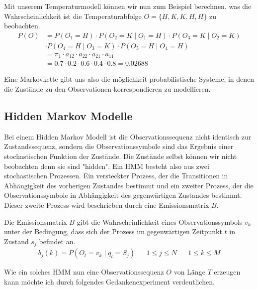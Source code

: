 Mit unserem Temperaturmodell können wir nun zum Beispiel berechnen, was die Wahrscheinlichkeit ist die Temperaturabfolge $O = \{H, K, K, H, H\}$ zu beobachten.
\begin{align*}
    P(O) & = P(O_1 = H) \cdot P(O_2 = K \mid O_1 = H) \cdot P(O_3 = K \mid O_2 = K) \\
    & \cdot P(O_4=H \mid O_3 = K) \cdot P(O_5 = H \mid O_4 = H) \\
    & = \pi_1 \cdot a_{12} \cdot a_{22} \cdot a_{21} \cdot a_{11} \\
    & = 0.7 \cdot 0.2 \cdot 0.6 \cdot 0.4 \cdot 0.8 = 0.02688
\end{align*}

Eine Markovkette gibt uns also die möglichkeit probabilistische Systeme, in denen die Zustände zu den Observationen korrespondieren zu modellieren.

\subsection{Hidden Markov Modelle}
Bei einem Hidden Markov Modell ist die Observationssequenz nicht identisch zur Zustandssequenz, sondern die Observationssymbole sind das Ergebnis einer stochastischen Funktion der Zustände. Die Zustände selbst können wir nicht beobachten denn sie sind "hidden". Ein HMM besteht also aus zwei stochastischen Prozessen. Ein versteckter Prozess, der die Transitionen in Abhängigkeit des vorherigen Zustandes bestimmt und ein zweiter Prozess, der die Observationssymbole in Abhängigkeit des gegenwärtigen Zustandes bestimmt.
Dieser zweite Prozess wird beschrieben durch eine Emissionsmatrix $B$.
\begin{definition}[Emissionsmatrix $B=\{b_j(k)\}$]

    Die Emissionsmatrix $B$ gibt die Wahrscheinlichkeit eines Observationssymbols $v_k$ unter der Bedingung, dass sich der Prozess im gegenwärtigen Zeitpunkt $t$ in Zustand $s_j$ befindet an.
    \begin{align}
        b_j(k) = P(O_t = v_k \mid q_t = S_j) && 1 \leq j \leq N && 1 \leq k \leq M
    \end{align}
\end{definition}

Wie ein solches HMM nun eine Observationssequenz $O$ von Länge $T$ erzeugen kann möchte ich durch folgendes Gedankenexperiment verdeutlichen.

